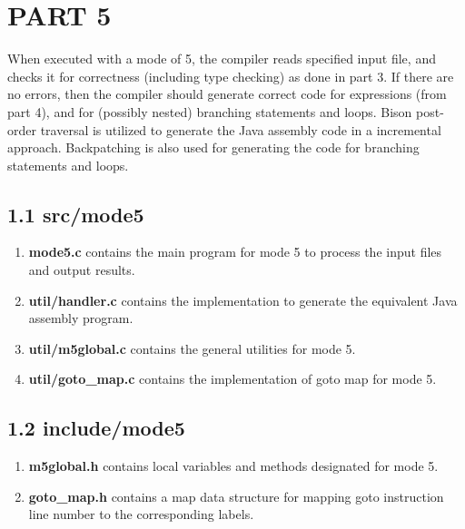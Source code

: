 \section*{PART 5}

When executed with a mode of 5, the compiler reads specified input file, and checks it for correctness (including type checking) as done in part 3. If there are no errors, then the compiler should generate correct code for expressions (from part 4), and for (possibly nested) branching statements and loops. Bison post-order traversal is utilized to generate the Java assembly code in a incremental approach. Backpatching is also used for generating the code for branching statements and loops.

\subsection*{1.1 \large\textbf{src/mode5}}
\begin{enumerate}
    
    \item \textbf{mode5.c} contains the main program for mode 5 to process the input files and output results.

    \item \textbf{util/handler.c} contains the implementation to generate the equivalent Java assembly program.

    \item \textbf{util/m5global.c} contains the general utilities for mode 5.

    \item \textbf{util/goto\_map.c} contains the implementation of goto map for mode 5.
\end{enumerate}

\subsection*{1.2 \large\textbf{include/mode5}}
\begin{enumerate}
    \item \textbf{m5global.h} contains local variables and methods designated for mode 5.
    \item \textbf{goto\_map.h} contains a map data structure for mapping goto instruction line number to the corresponding labels.
\end{enumerate} 